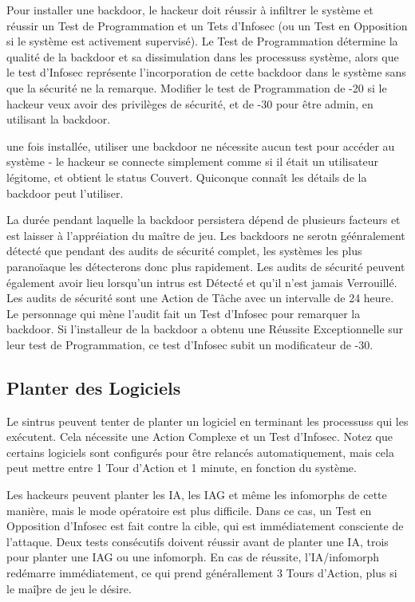 Pour installer une backdoor, le hackeur doit réussir à infiltrer le système et réussir un Test de Programmation et un Tets d'Infosec (ou un Test en Opposition si le système est activement supervisé). Le Test de Programmation détermine la qualité de la backdoor et sa dissimulation dans les processuss système, alors que le test d'Infosec représente l'incorporation de cette backdoor dans le système sans que la sécurité ne la remarque. Modifier le test de Programmation de -20 si le hackeur veux avoir des privilèges de sécurité, et de -30 pour être admin, en utilisant la backdoor. 

une fois installée, utiliser une backdoor ne nécessite aucun test pour accéder au système - le hackeur se connecte simplement comme si il était un utilisateur légitome, et obtient le status Couvert. Quiconque connaît les détails de la backdoor peut l'utiliser. 

La durée pendant laquelle la backdoor persistera dépend de plusieurs facteurs et est laisser à l'appréiation du maître de jeu. Les backdoors ne serotn géénralement détecté que pendant des audits de sécurité complet, les systèmes les plus paranoïaque les détecterons donc plus rapidement. Les audits de sécurité peuvent également avoir lieu lorsqu'un intrus est Détecté et qu'il n'est jamais Verrouillé. Les audits de sécurité sont une Action de Tâche avec un intervalle de 24 heure. Le personnage qui mène l'audit fait un Test d'Infosec pour remarquer la backdoor. Si l'installeur de la backdoor a obtenu une Réussite Exceptionnelle sur leur test de Programmation, ce test d'Infosec subit un modificateur de -30. 

\subsection{Planter des Logiciels} 

Le sintrus peuvent tenter de planter un logiciel en terminant les processuss qui les exécutent. Cela nécessite une Action Complexe et un Test d'Infosec. Notez que certains logiciels sont configurés pour être relancés automatiquement, mais cela peut mettre entre 1 Tour d'Action et 1 minute, en fonction du système. 

Les hackeurs peuvent planter les IA, les IAG et même les infomorphs de cette manière, mais le mode opératoire est plus difficile. Dans ce cas, un Test en Opposition d'Infosec est fait contre la cible, qui est immédiatement consciente de l'attaque. Deux tests consécutifs doivent réussir avant de planter une IA, trois pour planter une IAG ou une infomorph. En cas de réussite, l'IA/infomorph redémarre immédiatement, ce qui prend générallement 3 Tours d'Action, plus si le maîþre de jeu le désire. 

